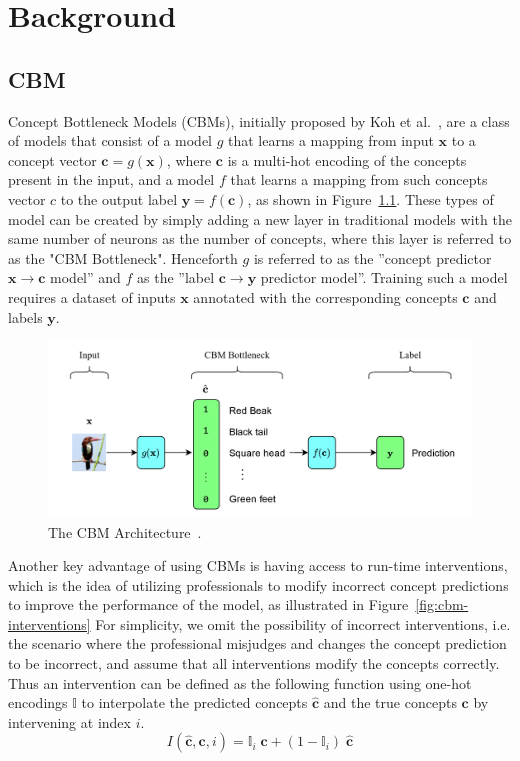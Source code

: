 \documentclass[../main.tex]{subfiles}
\begin{document}
\chapter{Background}

\section{CBM}\label{background:cbm}

Concept Bottleneck Models (CBMs), initially proposed by Koh et al.~\cite{cbm}, are a class of models
that consist of a model $g$ that learns a mapping from
input $\mathbf{x}$ to a concept vector $\mathbf{c} = g(\mathbf{x})$, 
where $\mathbf{c}$ is a multi-hot encoding of the concepts present in the input,
and a model $f$
that learns a mapping from such concepts vector $c$
to the output label $\mathbf{y} = f(\mathbf{c})$, as shown in Figure~\ref{fig:cbm}.
These types of model can be created by simply adding a new layer in traditional models
with the same number of neurons as the number of concepts, where this layer
is referred to as the "CBM Bottleneck". 
Henceforth $g$ is referred to as the ''concept predictor $\mathbf{x} \to \mathbf{c}$ model'' and $f$ as the
''label $\mathbf{c} \to \mathbf{y}$ predictor model''.
 Training such a model requires a
dataset of inputs $\mathbf{x}$ annotated with the corresponding 
concepts $\mathbf{c}$ and labels $\mathbf{y}$. 

\begin{figure}[!h]
    \centering
    \includegraphics[width=\textwidth]{figs/background/cbm.png}
    \caption{The CBM Architecture~\cite{cbm}.}
    \label{fig:cbm}
\end{figure}

Another key advantage of using CBMs is having access to 
run-time interventions, which is the idea of utilizing professionals
to modify incorrect concept predictions to improve the 
performance of the model, as illustrated in Figure~\ref{fig:cbm-interventions} For simplicity, we omit the
possibility of incorrect interventions, i.e. the scenario
where the professional misjudges and changes the concept prediction to be incorrect,
and assume that
all interventions modify the concepts correctly. Thus an intervention
can be defined as the following function using one-hot encodings $\mathbb{I}$ to interpolate
the predicted concepts $\hat{\mathbf{c}}$ and the true concepts $\mathbf{c}$ by intervening
at index $i$.
\[I(\hat{\mathbf{c}}, \mathbf{c}, i) = 
\mathbb{I}_i \; \mathbf{c} + (1 - \mathbb{I}_i) \; \hat{\mathbf{c}}\]
\end{document}
